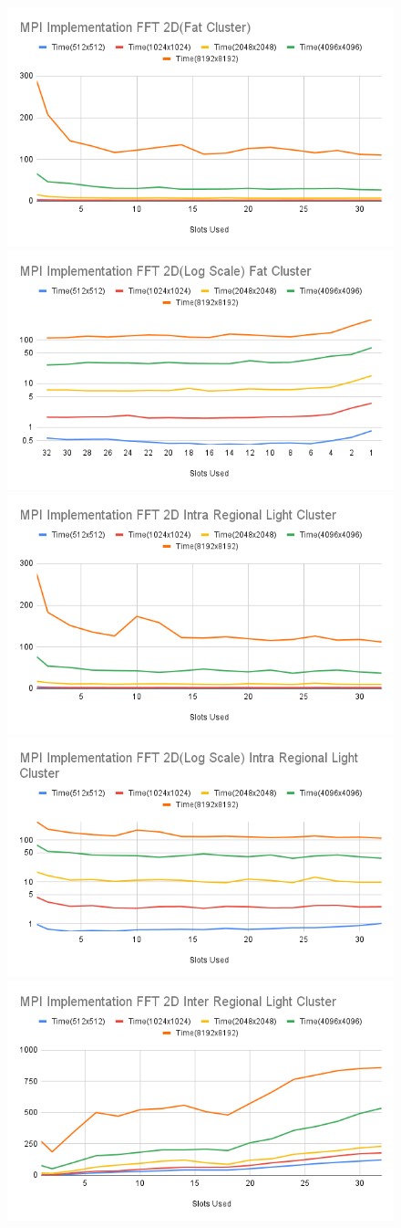\documentclass{article}
\begin{document}
\begin{figure}[hb]
    \includegraphics[width=.48\textwidth]{MPI Implementation FFT 2D(Fat Cluster).png}\hfill
    \includegraphics[width=.48\textwidth]{MPI Implementation FFT 2D(Log Scale) Fat Cluster.png}
    \\[\smallskipamount]
    \includegraphics[width=.48\textwidth]{MPI Implementation FFT 2D Intra Regional Light Cluster.png}\hfill
    \includegraphics[width=.48\textwidth]{MPI Implementation FFT 2D(Log Scale) Intra Regional Light Cluster.png}
    \\[\smallskipamount]
    \includegraphics[width=.48\textwidth]{MPI Implementation FFT 2D Inter Regional Light Cluster.png}\hfill

\end{figure}
\end{document}
